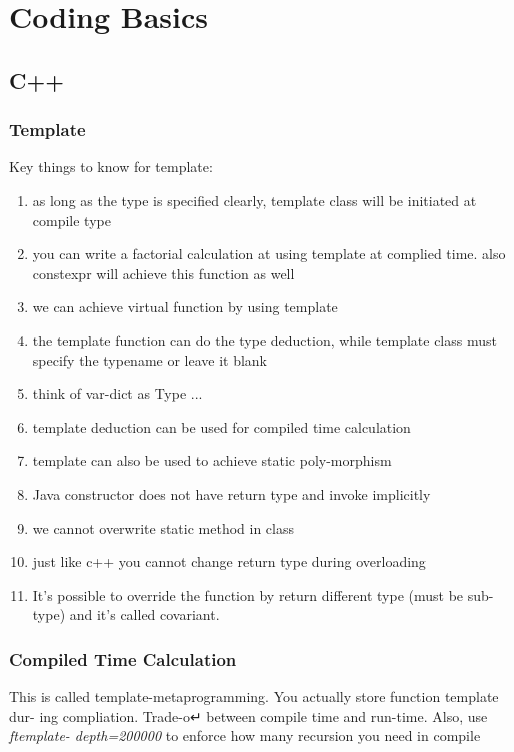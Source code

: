 \newpage
\section{Coding Basics}
\subsection{C++}
\subsubsection{Template}

Key things to know for template:
\begin{enumerate}
\item as long as the type is specified clearly, template class will be initiated at compile type
\item you can write a factorial calculation at using template at complied time. also {\color{blue}constexpr} will achieve this function as well
\item we can achieve virtual function by using template
\item the template function can do the type deduction, while template class must specify the typename or leave it blank
\item think of var-dict as Type ...
\item template deduction can be used for compiled time calculation
\item template can also be used to achieve static poly-morphism
\item Java constructor does not have return type and invoke implicitly
\item we cannot overwrite static method in class
\item just like c++ you cannot change return type during overloading
\item It's possible to override the function by return different type (must be sub-type) and it's called {\color{red}covariant}.
\end{enumerate}

\subsubsection{Compiled Time Calculation}
This is called template-metaprogramming. You actually store function template dur- ing compliation. Trade-o↵ between compile time and run-time. Also, use \textit{ftemplate- depth=200000} to enforce how many recursion you need in compile


